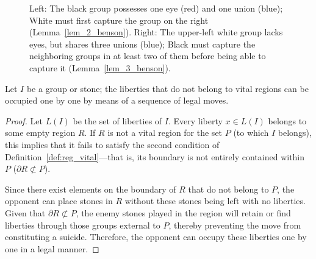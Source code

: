\begin{figure}[H]
	\caption{Left: The black group possesses one eye (red) and one union (blue); White must first capture the group on the right (Lemma~\ref{lem_2_benson}). Right: The upper-left white group lacks eyes, but shares three unions (blue); Black must capture the neighboring groups in at least two of them before being able to capture it (Lemma~\ref{lem_3_benson}).}
	\label{fig:lem_benson}
\end{figure}
\begin{lemma}\label{lem_4_benson}
	Let \(I\) be a group or stone; the liberties that do not belong to vital regions can be occupied one by one by means of a sequence of legal moves.
\end{lemma}
\begin{proof}
	Let \(L(I)\) be the set of liberties of \(I\). Every liberty \(x \in L(I)\) belongs to some empty region \(R\). If \(R\) is not a vital region for the set \(P\) (to which \(I\) belongs), this implies that it fails to satisfy the second condition of Definition~\ref{def:reg_vital}—that is, its boundary is not entirely contained within \(P\) (\(\partial R \not\subset P\)).
	
	Since there exist elements on the boundary of \(R\) that do not belong to \(P\), the opponent can place stones in \(R\) without these stones being left with no liberties. Given that \(\partial R \not\subset P\), the enemy stones played in the region will retain or find liberties through those groups external to \(P\), thereby preventing the move from constituting a suicide. Therefore, the opponent can occupy these liberties one by one in a legal manner.
\end{proof}
